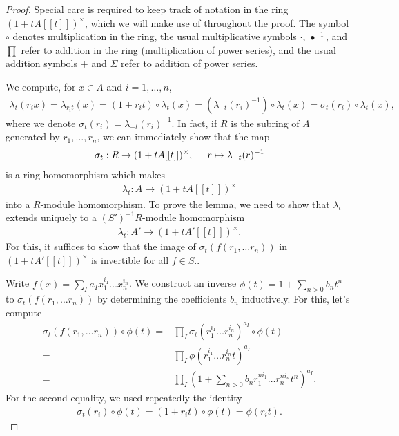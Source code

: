 \documentclass{amsart}
\theoremstyle{definition}
\numberwithin{equation}{section}
\begin{document}
\begin{proof}
Special care is required to keep track of notation in the ring $(1+t A[[t]])^\times$, which we will make use of throughout the proof. The symbol $\circ$ denotes multiplication in the ring, the usual multiplicative symbols $\cdot$, $\bullet^{-1}$, and $\prod$ refer to addition in the ring (multiplication of power series), and the usual addition symbols $+$ and $\Sigma$ refer to addition of power series.

We compute, for $x \in A$ and $i =1, \ldots , n$,
\begin{align*}
    \lambda_t(r_i x) = \lambda_{r_i t}(x) =  (1+r_i t) \circ \lambda_t(x) = (\lambda_{-t}(r_i)^{-1}) \circ \lambda_t(x) = \sigma_t(r_i) \circ \lambda_t(x),
\end{align*}
where we denote $\sigma_t(r_i) = \lambda_{-t}(r_i)^{-1}$. In fact, if $R$ is the subring of $A$ generated by $r_1, \ldots , r_n$, we can immediately show that the map
\begin{align*}
    \sigma_t: R \rightarrow (1+t A[[t]])^\times, \hspace{.5cm} r \mapsto \lambda_{-t}(r)^{-1}
\end{align*}
is a ring homomorphism which makes
\begin{align*}
    \lambda_t: A \rightarrow (1+t A[[t]])^\times
\end{align*}
into a $R$-module homomorphism. To prove the lemma, we need to show that $\lambda_t$ extends uniquely to a $(S')^{-1}R$-module homomorphism
\begin{align*}
    \lambda_t: A' \rightarrow (1+tA'[[t]])^\times.
\end{align*}
For this, it suffices to show that the image of $\sigma_t(f(r_1, \ldots r_n))$ in $(1+tA'[[t]])^\times$ is invertible for all $f \in S$..

Write $f(x) = \sum_I a_I x_1^{i_1} \ldots x_n^{i_n}$. We construct an inverse $\phi(t) = 1 + \sum_{n > 0} b_n t^n$ to $\sigma_t(f(r_1, \ldots r_n))$ by determining the coefficients $b_n$ inductively. For this, let's compute
\begin{align*}
     \sigma_t(f(r_1, \ldots r_n)) \circ \phi(t) 
        =& \prod_I \sigma_t( r_1^{i_1} \ldots r_n^{i_n} )^{a_I} \circ \phi(t) \\
        =& \prod_I \phi(r_1^{i_1} \ldots r_n^{i_n} t)^{a_I} \\
        =& \prod_I (1+\sum_{n>0} b_n r_1^{n i_1} \ldots r_n^{n i_n} t^n)^{a_I}.
\end{align*}
For the second equality, we used repeatedly the identity
\begin{align*}
    \sigma_t(r_i) \circ \phi(t) = (1+r_i t) \circ \phi(t) = \phi(r_i t).
\end{align*}


\end{proof}
\end{document}
